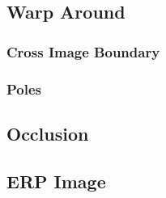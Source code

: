 \subsection{Warp Around}




\subsubsection{Cross Image Boundary}


\subsubsection{Poles}


\subsection{Occlusion}


\subsection{ERP Image}


